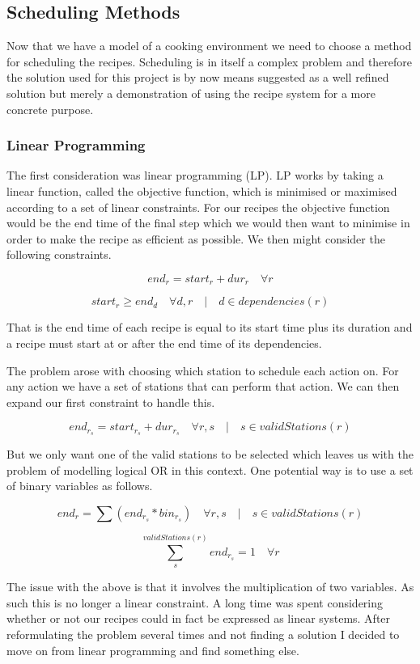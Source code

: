 \documentclass[11pt]{article}
\begin{document}
\subsection{Scheduling Methods}

Now that we have a model of a cooking environment we need to choose a method for scheduling the recipes.
Scheduling is in itself a complex problem and therefore the solution used for this project is by
now means suggested as a well refined solution but merely a demonstration of using the recipe system
for a more concrete purpose.

\subsubsection{Linear Programming}
The first consideration was linear programming (LP). LP works by taking a linear function, called
the objective function, which is minimised or maximised according to a set of linear constraints.
For our recipes the objective function would be the end time of the final step which we would then
want to minimise in order to make the recipe as efficient as possible. We then might consider the
following constraints.

\[ end_r = start_r + dur_r \quad \forall r \]

\[ start_r \geq end_d \quad \forall d,r \quad | \quad d \in dependencies(r) \]

That is the end time of each recipe is equal to its start time plus its duration and a recipe
must start at or after the end time of its dependencies.

The problem arose with choosing which station to schedule each action on. For any action we
have a set of stations that can perform that action. We can then expand our first constraint
to handle this.

\[ end_{r_s} = start_{r_s} + dur_{r_s} \quad \forall r,s \quad | \quad s \in validStations(r) \]

But we only want one of the valid stations to be selected which leaves us with the problem
of modelling logical OR in this context. One potential way is to use a set of binary variables
as follows.

\[ end_r = \sum (end_{r_s} * bin_{r_s}) \quad \forall r,s \quad | \quad s \in validStations(r) \]

\[ \sum_{s}^{validStations(r)} end_{r_s} = 1 \quad \forall r \]

The issue with the above is that it involves the multiplication of two variables. As such this
is no longer a linear constraint. A long time was spent considering whether or not our recipes
could in fact be expressed as linear systems. After reformulating the problem several times
and not finding a solution I decided to move on from linear programming and find something else.
\end{document}
